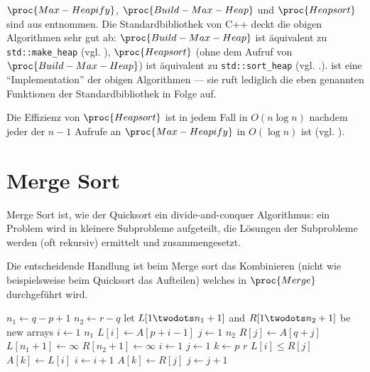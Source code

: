 $\proc{Max-Heapify}$, $\proc{Build-Max-Heap}$ und $\proc{Heapsort}$ sind aus \cite[154, 157]{clrs2001} entnommen. Die Standardbibliothek von C++ deckt die obigen Algorithmen sehr gut ab: $\proc{Build-Max-Heap}$ ist äquivalent zu \lstinline{std::make_heap} (vgl. \cite[933]{ISO-C++17}), $\proc{Heap\-sort}$ (ohne dem Aufruf von\linebreak[4] $\proc{Build-Max-Heap}$) ist äquivalent zu  \lstinline{std::sort_heap} (vgl. \cite[933]{ISO-C++17}.).  ist eine \enquote{Implementation} der obigen Algorithmen --- sie ruft lediglich die eben genannten Funktionen der Standardbibliothek in Folge auf.

Die Effizienz von $\proc{Heapsort}$ ist in jedem Fall in $O(n \log n)$ nachdem jeder der $n - 1$ Aufrufe an $\proc{Max-Heapify}$ in $O(\log n)$ ist (vgl. \cite[160]{clrs2001}).

\section{Merge Sort}
\label{sec:alg-merging}

Merge Sort ist, wie der Quicksort ein divide-and-conquer Algorithmus: ein Problem wird in kleinere Subprobleme aufgeteilt, die Lösungen der Subprobleme werden (oft rekursiv) ermittelt und zusammengesetzt.

Die entscheidende Handlung ist beim Merge sort das Kombinieren (nicht wie beispielsweise beim Quicksort das Aufteilen) welches in $\proc{Merge}$ durchgeführt wird.

\begin{codebox}
    \li $n_1 \gets q - p + 1$ \label{ln:merge-subarr-length-1}
    \li $n_2 \gets r - q$ \label{ln:merge-subarr-length-2}
    \li let $L[1 \twodots n_1 + 1]$ and $R[1 \twodots n_2 + 1]$ be new arrays \label{ln:merge-subarr-creation}
    \li \For $i \gets 1$ \To $n_1$ \label{ln:merge-copy-begin}
    \li     \Do
                $L[i] \gets A[p + i - 1]$
            \End
    \li \For $j \gets 1$ \To $n_2$ \label{ln:merge-copy-for-2}
    \li     \Do
                $R[j] \gets A[q + j]$
            \End \label{ln:merge-copy-end}
    \li $L[n_1 + 1] \gets \infty$ \label{ln:merge-infty-assign-1}
    \li $R[n_2 + 1] \gets \infty$ \label{ln:merge-infty-assign-2}
    \li $i \gets 1$
    \li $j \gets 1$ \label{ln:merge-index-setup-2}
    \li \For $k \gets p$ \To $r$ \label{ln:merge-for-begin}
    \li     \Do
                \If $L[i] \leq R[j]$
                    \Then
    \li                 $A[k] \gets L[i]$
    \li                 $i \gets i + 1$
                    \Else
                        $A[k] \gets R[j]$
    \li                 $j \gets j + 1$
                    \End
            \End \label{ln:merge-for-end}
\end{codebox}

